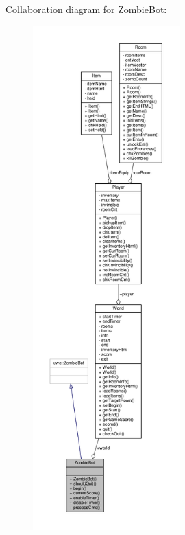 Collaboration diagram for Zombie\+Bot\+:
\nopagebreak
\begin{figure}[H]
\begin{center}
\leavevmode
\includegraphics[height=550pt]{class_zombie_bot__coll__graph}
\end{center}
\end{figure}
